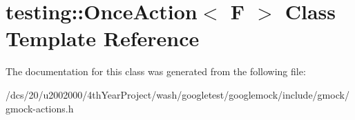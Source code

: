 \hypertarget{classtesting_1_1OnceAction}{}\section{testing\+:\+:Once\+Action$<$ F $>$ Class Template Reference}
\label{classtesting_1_1OnceAction}


The documentation for this class was generated from the following file\+:\begin{DoxyCompactItemize}
\item 
/dcs/20/u2002000/4th\+Year\+Project/wash/googletest/googlemock/include/gmock/gmock-\/actions.\+h\end{DoxyCompactItemize}
